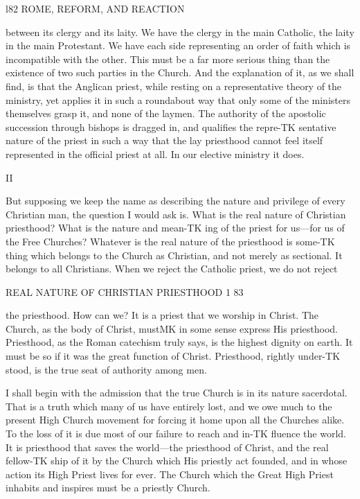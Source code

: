 \documentclass[12pt,a5paper,oneside]{book}
\begin{document}
{l82 ROME, REFORM, AND REACTION 

between its clergy and its laity. We have the clergy 
in the main Catholic, the laity in the main Protestant. 
We have each side representing an order of faith which 
is incompatible with the other. This must be a far 
more serious thing than the existence of two such 
parties in the Church. And the explanation of it, 
as we shall find, is that the Anglican priest, while 
resting on a representative theory of the ministry, yet 
applies it in such a roundabout way that only some of 
the ministers themselves grasp it, and none of the 
laymen. The authority of the apostolic succession 
through bishops is dragged in, and qualifies the repre-TK
sentative nature of the priest in such a way that the 
lay priesthood cannot feel itself represented in the 
official priest at all. In our elective ministry it 
does. 

II 

But supposing we keep the name as describing the 
nature and privilege of every Christian man, the 
question I would ask is. What is the real nature of 
Christian priesthood? What is the nature and mean-TK
ing of the priest for us---for us of the Free Churches? 
Whatever is the real nature of the priesthood is some-TK
thing which belongs to the Church as Christian, and 
not merely as sectional. It belongs to all Christians. 
When we reject the Catholic priest, we do not reject 



REAL NATURE OF CHRISTIAN PRIESTHOOD 1 83 

the priesthood. How can we? It is a priest that 
we worship in Christ. The Church, as the body of 
Christ, mustMK in some sense express His priesthood. 
Priesthood, as the Roman catechism truly says, is the 
highest dignity on earth. It must be so if it was the 
great function of Christ. Priesthood, rightly under-TK
stood, is the true seat of authority among men. 

I shall begin with the admission that the true 
Church is in its nature sacerdotal. That is a truth 
which many of us have entirely lost, and we owe much 
to the present High Church movement for forcing it 
home upon all the Churches alike. To the loss 
of it is due most of our failure to reach and in-TK
fluence the world. It is priesthood that saves the 
world---the priesthood of Christ, and the real fellow-TK
ship of it by the Church which His priestly act 
founded, and in whose action its High Priest lives 
for ever. The Church which the Great High Priest 
inhabits and inspires must be a priestly Church. 

}
\end{document}

